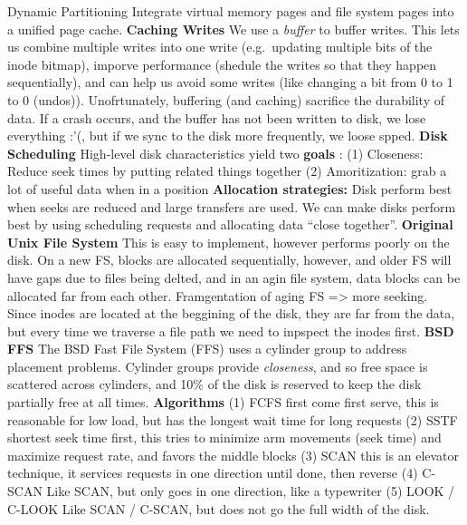 Dynamic Partitioning
Integrate virtual memory pages and file system pages into a unified page
cache.
{\bf Caching Writes}
We use a \emph{buffer} to buffer writes. This lets us combine multiple
writes into one write (e.g.~updating multiple bits of the inode bitmap),
imporve performance (shedule the writes so that they happen
sequentially), and can help us avoid some writes (like changing a bit
from 0 to 1 to 0 (undos)).
Unofrtunately, buffering (and caching) sacrifice the durability of data.
If a crash occurs, and the buffer has not been written to disk, we lose
everything :'(, but if we sync to the disk more frequently, we loose
spped.
{\bf Disk Scheduling}
High-level disk characteristics yield two {\bf goals }:
(1) Closeness: Reduce seek times by putting related things together
(2) Amoritization: grab a lot of useful data when in a position
{\bf Allocation strategies:}
Disk perform best when seeks are reduced and large transfers are used.
We can make disks perform best by using scheduling requests and
allocating data ``close together''.
{\bf Original Unix File
System}
This is easy to implement, however performs poorly on the disk. On a new
FS, blocks are allocated sequentially, however, and older FS will have
gaps due to files being delted, and in an agin file system, data blocks
can be allocated far from each other. Framgentation of aging FS
=\textgreater{} more seeking.\\
Since inodes are located at the beggining of the disk, they are far from
the data, but every time we traverse a file path we need to inpspect the
inodes first.
{\bf BSD FFS}
The BSD Fast File System (FFS) uses a cylinder group to address
placement problems.
Cylinder groups provide \emph{closeness}, and so free space is scattered
across cylinders, and 10\% of the disk is reserved to keep the disk
partially free at all times.
{\bf Algorithms}
  (1) FCFS
  first come first serve, this is reasonable for low load, but has the
  longest wait time for long requests
  (2)
  SSTF
  shortest seek time first, this tries to minimize arm movements (seek
  time) and maximize request rate, and favors the middle blocks
  (3) SCAN
  this is an elevator technique, it services requests in one direction
  until done, then reverse
  (4) C-SCAN
  Like SCAN, but only goes in one direction, like a typewriter
  (5) LOOK / C-LOOK
  Like SCAN / C-SCAN, but does not go the full width of the disk.
